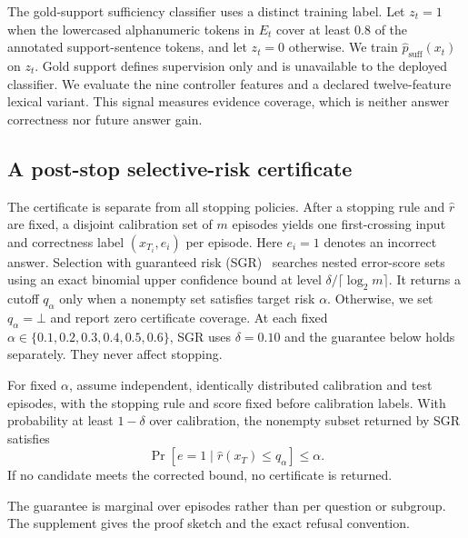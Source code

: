 The gold-support sufficiency classifier uses a distinct training label. Let
$z_t=1$ when the lowercased alphanumeric tokens in $E_t$ cover at least 0.8 of
the annotated support-sentence tokens, and let $z_t=0$ otherwise. We train
$\hat p_{\mathrm{suff}}(x_t)$ on $z_t$.
Gold support defines supervision only and is unavailable to the deployed
classifier. We evaluate the nine controller features and a declared
twelve-feature lexical variant. This signal measures evidence coverage, which
is neither answer correctness nor future answer gain.

\subsection{A post-stop selective-risk certificate}
\label{sec:conformal-theory}

The certificate is separate from all stopping policies. After a stopping rule
and $\hat r$ are fixed, a disjoint calibration set of $m$ episodes yields one
first-crossing input and correctness label $(x_{T_i},e_i)$ per episode. Here
$e_i=1$ denotes an incorrect answer. Selection with guaranteed risk
(SGR)~\cite{geifman2017selective} searches nested error-score sets using an
exact binomial upper confidence bound at level
$\delta/\lceil\log_2 m\rceil$. It returns a cutoff $q_\alpha$ only when a
nonempty set satisfies target risk $\alpha$. Otherwise, we set
$q_\alpha=\bot$ and report zero certificate coverage. At each fixed
$\alpha\in\{0.1,0.2,0.3,0.4,0.5,0.6\}$, SGR uses $\delta=0.10$ and the
guarantee below holds separately. They never affect stopping.

\begin{proposition}
\label{prop:conformal}
For fixed $\alpha$, assume independent, identically distributed calibration
and test episodes, with the stopping rule and score fixed before calibration
labels. With probability at least $1-\delta$ over calibration, the nonempty
subset returned by SGR
satisfies
\[
\Pr[e=1\mid \hat r(x_T)\le q_\alpha]\le\alpha.
\]
If no candidate meets the corrected bound, no certificate is returned.
\end{proposition}

The guarantee is marginal over episodes rather than per question or subgroup.
The supplement gives the proof sketch and the exact refusal convention.
